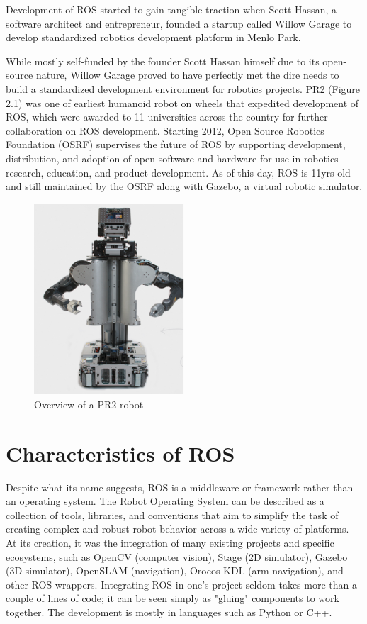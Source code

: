 \documentclass[twoside]{article}
\begin{document}
Development of ROS started to gain tangible traction when Scott Hassan, a software architect and entrepreneur, founded a startup called Willow Garage to develop standardized robotics development platform in Menlo Park. 

While mostly self-funded by the founder Scott Hassan himself due to its open-source nature, Willow Garage proved to have perfectly met the dire needs to build a standardized development environment for robotics projects. PR2 (Figure 2.1) was one of earliest humanoid robot on wheels that expedited development of ROS, which were awarded to 11 universities across the country for further collaboration on ROS development. 
Starting 2012, Open Source Robotics Foundation (OSRF) supervises the future of ROS by supporting development, distribution, and adoption of open software and hardware for use in robotics research, education, and product development. As of this day, ROS is 11yrs old and still maintained by the OSRF along with Gazebo, a virtual robotic simulator.
\begin{figure}[ht]\label{fig:1}
\centering
\includegraphics[width=0.5\textwidth]{PR2}
\caption{Overview of a PR2 robot}
\end{figure}

\section{Characteristics of ROS}\label{characteristics}\label{sec:characteristics}
Despite what its name suggests, ROS is a middleware or framework rather than an operating system. The Robot Operating System can be described as a collection of tools, libraries, and conventions that aim to simplify the task of creating complex and robust robot behavior across a wide variety of platforms. At its creation, it was the integration of many existing projects and specific ecosystems, such as OpenCV (computer vision), Stage (2D simulator), Gazebo (3D simulator), OpenSLAM (navigation), Orocos KDL (arm navigation), and other ROS wrappers. Integrating ROS in one's project seldom takes more than a couple of lines of code; it can be seen simply as "gluing" components to work together. The development is mostly in languages such as Python or C++.
\end{document}
